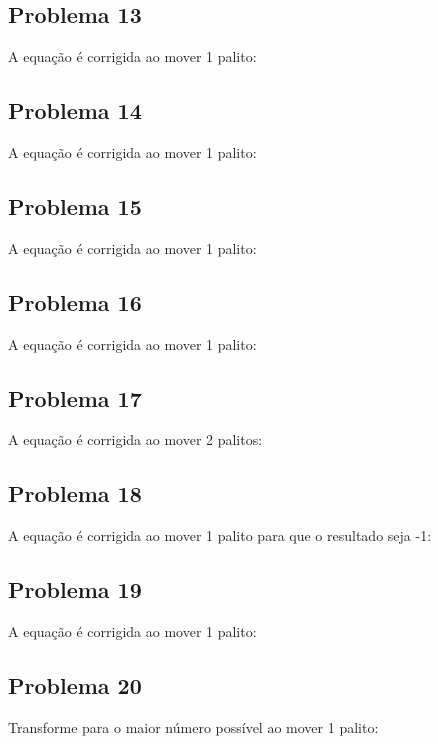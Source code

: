 \documentclass[a4paper,11pt]{article}
\begin{document}
  \subsection*{Problema 13}
  A equação é corrigida ao mover 1 palito:

  \digitTwo \minus \digitThree \equal \digitSix
  
  \subsection*{Problema 14}
  A equação é corrigida ao mover 1 palito:

  \digitThree \minus \digitTwo \equal \digitSeven
  
  \subsection*{Problema 15}
  A equação é corrigida ao mover 1 palito:

  \digitZero \minus \digitZero \equal \digitSix

  \subsection*{Problema 16}
  A equação é corrigida ao mover 1 palito:

  \digitThree \plus \digitOne \equal \digitEight

  \subsection*{Problema 17}
  A equação é corrigida ao mover 2 palitos:

  \digitSix \minus \digitZero \equal \digitEight \digitOne
  
  \subsection*{Problema 18}
  A equação é corrigida ao mover 1 palito para que o resultado seja -1:

  \digitEight \minus \digitOne \equal \minus \digitOne   
     
  \subsection*{Problema 19}
  A equação é corrigida ao mover 1 palito:

  \digitSix \plus \digitFour \equal \digitFour

  \subsection*{Problema 20}
  Transforme para o maior número possível ao mover 1 palito:
\end{document}

